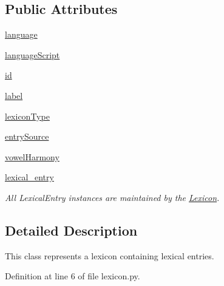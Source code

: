 \subsection*{Public Attributes}
\begin{DoxyCompactItemize}
\item 
\hyperlink{classsrc_1_1core_1_1lexicon_1_1_lexicon_a142d9d1c45eac0ece70b80c5a8033b02}{language}
\item 
\hyperlink{classsrc_1_1core_1_1lexicon_1_1_lexicon_a0e5ff6cffd788ae4ca6bdd069c6938ba}{language\+Script}
\item 
\hyperlink{classsrc_1_1core_1_1lexicon_1_1_lexicon_ac76ee39a545b73a67d005b00645ec7cc}{id}
\item 
\hyperlink{classsrc_1_1core_1_1lexicon_1_1_lexicon_a478e60c805dd1d5bc4e2bf7f3b5c8be0}{label}
\item 
\hyperlink{classsrc_1_1core_1_1lexicon_1_1_lexicon_a1e0df327bd01235e6e38a214584cef5d}{lexicon\+Type}
\item 
\hyperlink{classsrc_1_1core_1_1lexicon_1_1_lexicon_a0d7e1062a1ed7788520c7db08e8b1d40}{entry\+Source}
\item 
\hyperlink{classsrc_1_1core_1_1lexicon_1_1_lexicon_a90017a2b027d2510fcdd6ff2be0ea7af}{vowel\+Harmony}
\item 
\hyperlink{classsrc_1_1core_1_1lexicon_1_1_lexicon_a634b78912763e32484be1adb095bbe21}{lexical\+\_\+entry}
\begin{DoxyCompactList}\small\item\em All Lexical\+Entry instances are maintained by the \hyperlink{classsrc_1_1core_1_1lexicon_1_1_lexicon}{Lexicon}. \end{DoxyCompactList}\end{DoxyCompactItemize}


\subsection{Detailed Description}
This class represents a lexicon containing lexical entries. 

Definition at line 6 of file lexicon.\+py.



